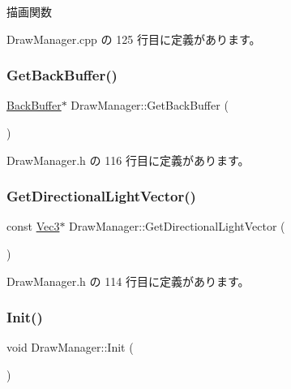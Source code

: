 描画関数 



 Draw\+Manager.\+cpp の 125 行目に定義があります。

\mbox{\label{class_draw_manager_a0e7e11e650f1c1736e9d3199a58191a7}} 
\subsubsection{\texorpdfstring{Get\+Back\+Buffer()}{GetBackBuffer()}}
{\footnotesize\ttfamily \mbox{\hyperlink{class_back_buffer}{Back\+Buffer}}$\ast$ Draw\+Manager\+::\+Get\+Back\+Buffer (\begin{DoxyParamCaption}{ }\end{DoxyParamCaption})\hspace{0.3cm}{\ttfamily [inline]}}



 Draw\+Manager.\+h の 116 行目に定義があります。

\mbox{\label{class_draw_manager_a952023ad9e2e12844c93e37029a32700}} 
\subsubsection{\texorpdfstring{Get\+Directional\+Light\+Vector()}{GetDirectionalLightVector()}}
{\footnotesize\ttfamily const \mbox{\hyperlink{_vector3_d_8h_ab16f59e4393f29a01ec8b9bbbabbe65d}{Vec3}}$\ast$ Draw\+Manager\+::\+Get\+Directional\+Light\+Vector (\begin{DoxyParamCaption}{ }\end{DoxyParamCaption})\hspace{0.3cm}{\ttfamily [inline]}}



 Draw\+Manager.\+h の 114 行目に定義があります。

\mbox{\label{class_draw_manager_a3cb9319d492285bd9dfc983d27e5d04f}} 
\subsubsection{\texorpdfstring{Init()}{Init()}}
{\footnotesize\ttfamily void Draw\+Manager\+::\+Init (\begin{DoxyParamCaption}{ }\end{DoxyParamCaption})}




